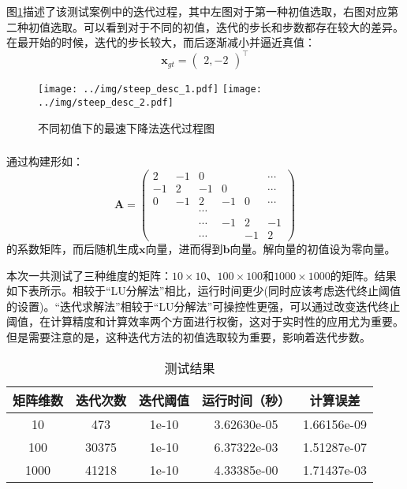 \documentclass[12pt, onecolumn]{article}
\newcommand\normf{\fangsong}
\begin{document}
	图\ref{fig:最速下降法迭代过程图}描述了该测试案例中的迭代过程，其中左图对于第一种初值选取，右图对应第二种初值选取。可以看到对于不同的初值，迭代的步长和步数都存在较大的差异。在最开始的时候，迭代的步长较大，而后逐渐减小并逼近真值：
	\begin{equation}
	\boldsymbol{x}_{gt}=\begin{pmatrix}
	2,-2
	\end{pmatrix}^\top
	\end{equation}
		\begin{figure}[h]
			\centering
			\texttt{[image: ../img/steep\_desc\_1.pdf]}
			\texttt{[image: ../img/steep\_desc\_2.pdf]}
			\caption{\normf 不同初值下的最速下降法迭代过程图}
			\label{fig:最速下降法迭代过程图}
		\end{figure}
	
	\subsubsection{\normf{大型稀疏矩阵测试}}
	通过构建形如：
	\begin{equation}
	\boldsymbol{A}=\begin{pmatrix}
	2&-1&0&&&\cdots\\
	-1&2&-1&0&&\cdots\\
	0&-1&2&-1&0&\cdots\\
	&&\cdots\\
	&&\cdots&-1&2&-1\\
	&&\cdots&&-1&2
	\end{pmatrix}
	\end{equation}
	的系数矩阵，而后随机生成$\boldsymbol{x}$向量，进而得到$\boldsymbol{b}$向量。解向量的初值设为零向量。
	
	本次一共测试了三种维度的矩阵：$10\times 10$、$100\times 100$和$1000\times 1000$的矩阵。结果如下表所示。相较于“LU分解法”相比，运行时间更少(同时应该考虑迭代终止阈值的设置)。“迭代求解法”相较于“LU分解法”可操控性更强，可以通过改变迭代终止阈值，在计算精度和计算效率两个方面进行权衡，这对于实时性的应用尤为重要。但是需要注意的是，这种迭代方法的初值选取较为重要，影响着迭代步数。
	\begin{table}[h]
	\normf
	\centering
	\caption{\normf 测试结果}
	\vspace{2mm}
	\begin{tabular}{c|cccc}
	\toprule
	矩阵维数 & 迭代次数  & 迭代阈值  & 运行时间（秒）     & 计算误差        \\ \midrule
	10   & 473   & 1e-10 & 3.62630e-05 & 1.66156e-09 \\
	100  & 30375 & 1e-10 & 6.37322e-03 & 1.51287e-07 \\
	1000 & 41218 & 1e-10 & 4.33385e-00 & 1.71437e-03 \\ \bottomrule
	\end{tabular}
	\end{table}
	
\end{document}
